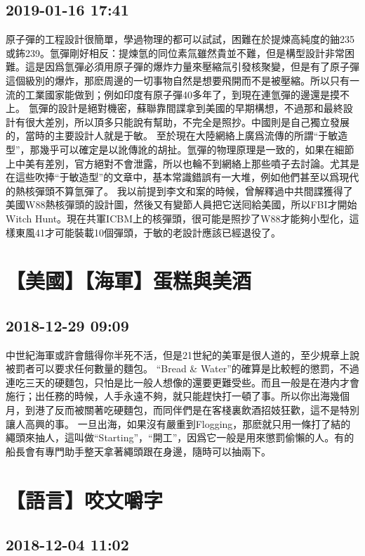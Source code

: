 \documentclass[twocolumn]{ctexart}
\begin{document}
\subsection*{2019-01-16 17:41}

原子彈的工程設計很簡單，學過物理的都可以試試，困難在於提煉高純度的鈾235或鈽239。氫彈剛好相反：提煉氫的同位素氚雖然貴並不難，但是構型設計非常困難。這是因爲氫彈必須用原子彈的爆炸力量來壓縮氚引發核聚變，但是有了原子彈這個級別的爆炸，那麽周邊的一切事物自然是想要飛開而不是被壓縮。所以只有一流的工業國家能做到；例如印度有原子彈40多年了，到現在連氫彈的邊還是摸不上。 
氫彈的設計是絕對機密，蘇聯靠間諜拿到美國的早期構想，不過那和最終設計有很大差別，所以頂多只能說有幫助，不完全是照抄。中國則是自己獨立發展的，當時的主要設計人就是于敏。 
至於現在大陸網絡上廣爲流傳的所謂“于敏造型”，那幾乎可以確定是以訛傳訛的胡扯。氫彈的物理原理是一致的，如果在細節上中美有差別，官方絕對不會泄露，所以也輪不到網絡上那些噴子去討論。尤其是在這些吹捧“于敏造型”的文章中，基本常識錯誤有一大堆，例如他們甚至以爲現代的熱核彈頭不算氫彈了。 
我以前提到李文和案的時候，曾解釋過中共間諜獲得了美國W88熱核彈頭的設計圖，然後又有變節人員把它送囘給美國，所以FBI才開始Witch Hunt。現在共軍ICBM上的核彈頭，很可能是照抄了W88才能夠小型化，這樣東風41才可能裝載10個彈頭，于敏的老設計應該已經退役了。
\section*{【美國】【海軍】蛋糕與美酒}
\subsection*{2018-12-29 09:09}

中世紀海軍或許會餓得你半死不活，但是21世紀的美軍是很人道的，至少規章上說被罰者可以要求任何數量的麵包。 
“Bread \& Water”的確算是比較輕的懲罰，不過連吃三天的硬麵包，只怕是比一般人想像的還要更難受些。而且一般是在港内才會施行；出任務的時候，人手永遠不夠，就只能趕快打一頓了事。所以你出海幾個月，到港了反而被關著吃硬麵包，而同伴們是在客棧裏飲酒招妓狂歡，這不是特別讓人高興的事。 
一旦出海，如果沒有嚴重到Flogging，那麽就只用一條打了結的繩頭來抽人，這叫做“Starting”，“開工”，因爲它一般是用來懲罰偷懶的人。有的船長會有專門助手整天拿著繩頭跟在身邊，隨時可以抽兩下。
\section*{【語言】咬文嚼字}
\subsection*{2018-12-04 11:02}
\end{document}
